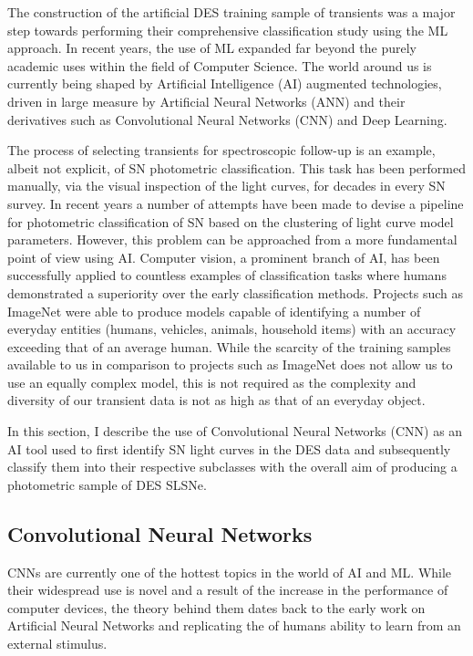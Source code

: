 The construction of the artificial DES training sample of transients was a major step towards performing their comprehensive classification study using the ML approach. In recent years, the use of ML expanded far beyond the purely academic uses within the field of Computer Science. The world around us is currently being shaped by Artificial Intelligence (AI) augmented technologies, driven in large measure by Artificial Neural Networks (ANN) and their derivatives such as Convolutional Neural Networks (CNN) and Deep Learning.

The process of selecting transients for spectroscopic follow-up is an example, albeit not explicit, of SN photometric classification. This task has been performed manually, via the visual inspection of the light curves, for decades in every SN survey. In recent years a number of attempts have been made to devise a pipeline for photometric classification of SN based on the clustering of light curve model parameters. However, this problem can be approached from a more fundamental point of view using AI. Computer vision, a prominent branch of AI, has been successfully applied to countless examples of classification tasks where humans demonstrated a superiority over the early classification methods. Projects such as ImageNet \citep{Russakovsky2014} were able to produce models capable of identifying a number of everyday entities (humans, vehicles, animals, household items) with an accuracy exceeding that of an average human. While the scarcity of the training samples available to us in comparison to projects such as ImageNet does not allow us to use an equally complex model, this is not required as the complexity and diversity of our transient data is not as high as that of an everyday object.

In this section, I describe the use of Convolutional Neural Networks (CNN) as an AI tool used to first identify SN light curves in the DES data and subsequently classify them into their respective subclasses with the overall aim of producing a photometric sample of DES SLSNe.

\subsection{Convolutional Neural Networks} \label{sec:CNN}
CNNs are currently one of the hottest topics in the world of AI and ML. While their widespread use is novel and a result of the increase in the performance of computer devices, the theory behind them dates back to the early work on Artificial Neural Networks \citep[ANN;][]{Mcculloch1943} and replicating the of humans ability to learn from an external stimulus.

